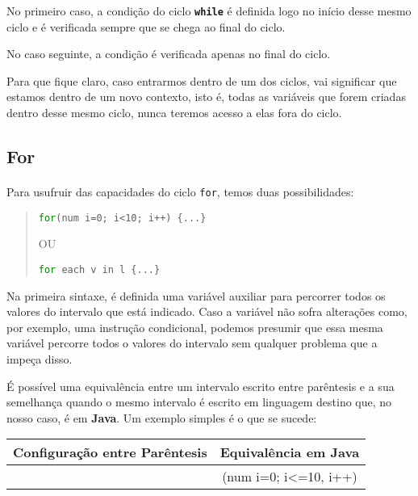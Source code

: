 \documentclass{report}
\begin{document}
No primeiro caso, a condição do ciclo \textbf{\texttt{while}} é definida logo no início desse mesmo ciclo e é verificada sempre que se chega ao final do ciclo.

No caso seguinte, a condição é verificada apenas no final do ciclo.

Para que fique claro, caso entrarmos dentro de um dos ciclos, vai significar que estamos dentro de um novo contexto, isto é, todas as variáveis que forem criadas dentro desse mesmo ciclo, nunca teremos acesso a elas fora do ciclo.


\subsection{For}

\paragraph{}

Para usufruir das capacidades do ciclo \texttt{for}, temos duas possibilidades:

\begin{quote}
	\texttt{\textcolor{green}{for}(num i=0; i<10; i++) \{...\}}
	
	OU
	
	\texttt{\textcolor{green}{for} each v in l \{...\}}

\end{quote}

Na primeira sintaxe, é definida uma variável auxiliar para percorrer todos os valores do intervalo que está indicado. Caso a variável não sofra alterações como, por exemplo, uma instrução condicional, podemos presumir que essa mesma variável percorre todos o valores do intervalo sem qualquer problema que a impeça disso.

É possível uma equivalência entre um intervalo escrito entre parêntesis e a sua semelhança quando o mesmo intervalo é escrito em linguagem destino que, no nosso caso, é em \textbf{Java}. Um exemplo simples é o que se sucede:

\begin{center}
\begin{tabular}{| c | c |}
	\hline
	\textbf{Configuração entre Parêntesis} & \textbf{Equivalência em Java} \\
	\hline
	[0, 10] 	& (num i=0; i<=10, i++) \\
	\hline
\end{tabular}
\end{center}
\end{document}
